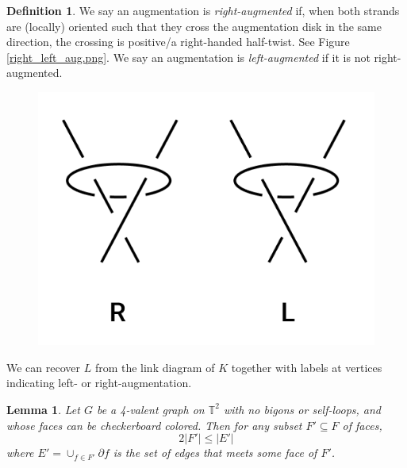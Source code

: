 \documentclass[11pt]{amsart}
\newcommand{\figref}[1]{Figure \ref{#1}}
\newcommand{\torus}{{\mathbb{T}^2}}
\newcommand{\del}{\partial}
\theoremstyle{plain}
\newtheorem{lemma}[theorem]{Lemma}
\theoremstyle{definition}
\newtheorem{define}[theorem]{Definition}
\begin{document}
\begin{define}
We say an augmentation is \emph{right-augmented} if, when both strands are
(locally) oriented such that they cross the augmentation disk in the same
direction, the crossing is positive/a right-handed half-twist.
See \figref{right_left_aug.png}.
We say an augmentation is \emph{left-augmented} if it is not right-augmented.
\begin{figure}
\label{f:right_left_aug}
\includegraphics{more_pictures/right_left_aug.png}
\end{figure}
\end{define}

We can recover $L$ from the link diagram of $K$
together with labels at vertices indicating left- or right-augmentation.


\begin{lemma}
\label{l:2fe}
Let $G$ be a 4-valent graph on $\torus$ with no bigons or self-loops,
and whose faces can be checkerboard colored.
Then for any subset $F' \subseteq F$ of faces,
\[
	2|F'| \leq |E'|
\]
where $E' = \cup_{f \in F'} \del f$ is the set of edges
that meets some face of $F'$.
\end{lemma}
\end{document}
